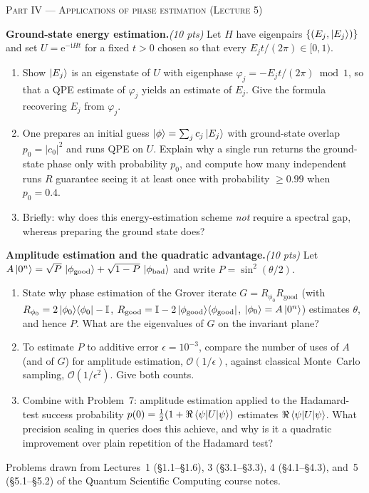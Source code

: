 \documentclass[11pt]{article}
\newcommand{\ii}{\mathrm{i}}
\newcommand{\ee}{\mathrm{e}}
\newcommand{\abs}[1]{\left\lvert #1 \right\rvert}
\newcommand{\bigo}{\mathcal{O}}
\newcommand{\id}{\mathbb{I}}
\newcommand{\proj}[1]{\ket{#1}\!\bra{#1}}
\newcommand{\pts}[1]{\hfill{\normalfont\itshape(#1 pts)}}
\begin{document}
\bigskip
\noindent\textsc{Part IV --- Applications of phase estimation (Lecture 5)}
\begin{problems}\setcounter{problemsi}{8}

\item \textbf{Ground-state energy estimation.}\pts{10}
Let $H$ have eigenpairs $\{(E_j,\ket{E_j})\}$ and set $U=\ee^{-\ii H t}$ for a fixed
$t>0$ chosen so that every $E_j t/(2\pi)\in[0,1)$.
\begin{enumerate}[label=(\alph*),nosep,leftmargin=2em]
  \item Show $\ket{E_j}$ is an eigenstate of $U$ with eigenphase
        $\varphi_j=-E_j t/(2\pi)\bmod 1$, so that a QPE estimate of $\varphi_j$ yields
        an estimate of $E_j$. Give the formula recovering $E_j$ from $\varphi_j$.
  \item One prepares an initial guess $\ket{\phi}=\sum_j c_j\ket{E_j}$ with
        ground-state overlap $p_0=\abs{c_0}^2$ and runs QPE on $U$. Explain why a
        single run returns the ground-state phase only with probability $p_0$, and
        compute how many independent runs $R$ guarantee seeing it at least once with
        probability $\ge0.99$ when $p_0=0.4$.
  \item Briefly: why does this energy-estimation scheme \emph{not} require a spectral
        gap, whereas preparing the ground state does?
\end{enumerate}

\item \textbf{Amplitude estimation and the quadratic advantage.}\pts{10}
Let $A\ket{0^n}=\sqrt{P}\,\ket{\phi_{\mathrm{good}}}+\sqrt{1-P}\,\ket{\phi_{\mathrm{bad}}}$
and write $P=\sin^2(\theta/2)$.
\begin{enumerate}[label=(\alph*),nosep,leftmargin=2em]
  \item State why phase estimation of the Grover iterate
        $G=R_{\phi_0}R_{\mathrm{good}}$ (with
        $R_{\phi_0}=2\proj{\phi_0}-\id$, $R_{\mathrm{good}}=\id-2\proj{\phi_{\mathrm{good}}}$,
        $\ket{\phi_0}=A\ket{0^n}$) estimates $\theta$, and hence $P$. What are the
        eigenvalues of $G$ on the invariant plane?
  \item To estimate $P$ to additive error $\epsilon=10^{-3}$, compare the number of
        uses of $A$ (and of $G$) for amplitude estimation, $\bigo(1/\epsilon)$, against
        classical Monte~Carlo sampling, $\bigo(1/\epsilon^2)$. Give both counts.
  \item Combine with Problem~7: amplitude estimation applied to the Hadamard-test
        success probability $p(0)=\tfrac12(1+\Re\braket{\psi|U|\psi})$ estimates
        $\Re\braket{\psi|U|\psi}$. What precision scaling in queries does this achieve,
        and why is it a quadratic improvement over plain repetition of the Hadamard
        test?
\end{enumerate}

\end{problems}

\vfill
\noindent\footnotesize Problems drawn from Lectures~1 (\S1.1--\S1.6), 3 (\S3.1--\S3.3),
4 (\S4.1--\S4.3), and~5 (\S5.1--\S5.2) of the Quantum Scientific Computing course notes.
\end{document}
